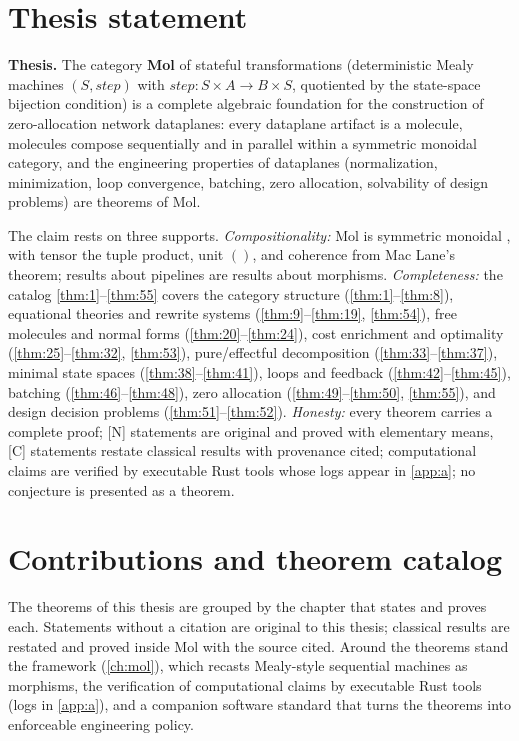 \section{Thesis statement}
\label{sec:thesis-statement}

\textbf{Thesis.} The category \textbf{Mol} of stateful transformations (deterministic Mealy machines $(S, \mathit{step})$ with $\mathit{step} : S \times A \to B \times S$, quotiented by the state-space bijection condition) is a complete algebraic foundation for the construction of zero-allocation network dataplanes: every dataplane artifact is a molecule, molecules compose sequentially and in parallel within a symmetric monoidal category, and the engineering properties of dataplanes (normalization, minimization, loop convergence, batching, zero allocation, solvability of design problems) are theorems of Mol.

The claim rests on three supports. \emph{Compositionality:} Mol is symmetric monoidal \citep{maclane}, with tensor the tuple product, unit $()$, and coherence from Mac Lane's theorem; results about pipelines are results about morphisms. \emph{Completeness:} the catalog \autoref{thm:1}--\autoref{thm:55} covers the category structure (\autoref{thm:1}--\autoref{thm:8}), equational theories and rewrite systems (\autoref{thm:9}--\autoref{thm:19}, \autoref{thm:54}), free molecules and normal forms (\autoref{thm:20}--\autoref{thm:24}), cost enrichment and optimality (\autoref{thm:25}--\autoref{thm:32}, \autoref{thm:53}), pure/effectful decomposition (\autoref{thm:33}--\autoref{thm:37}), minimal state spaces (\autoref{thm:38}--\autoref{thm:41}), loops and feedback (\autoref{thm:42}--\autoref{thm:45}), batching (\autoref{thm:46}--\autoref{thm:48}), zero allocation (\autoref{thm:49}--\autoref{thm:50}, \autoref{thm:55}), and design decision problems (\autoref{thm:51}--\autoref{thm:52}). \emph{Honesty:} every theorem carries a complete proof; [N] statements are original and proved with elementary means, [C] statements restate classical results with provenance cited; computational claims are verified by executable Rust tools whose logs appear in \autoref{app:a}; no conjecture is presented as a theorem.

\section{Contributions and theorem catalog}
\label{sec:contributions}

The theorems of this thesis are grouped by the chapter that states and
proves each. Statements without a citation are original to this thesis;
classical results are restated and proved inside Mol with the source
cited. Around the theorems stand the framework (\autoref{ch:mol}),
which recasts Mealy-style sequential machines \citep{mealy,moore} as
morphisms, the verification of computational claims by executable Rust
tools (logs in \autoref{app:a}), and a companion software standard that
turns the theorems into enforceable engineering policy.

